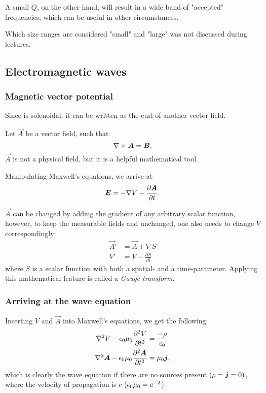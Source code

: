         A small $Q$, on the other hand, will result in a wide band of "accepted" frequencies, which can be useful in other circumstances.
    
        Which size ranges are considered "small" and "large" was not discussed during lectures. 

\subsection{Electromagnetic waves}
    \subsubsection{Magnetic vector potential}
        Since \B{} is solenoidal, it can be written as the curl of another vector field. 
        
        Let $\vec{A}$ be a vector field, such that
        \begin{equation}
            \nabla \times \bm{A} = \bm{B}.
        \end{equation}
        $\vec{A}$ is not a physical field, but it is a helpful mathematical tool. 

        Manipulating Maxwell's equations, we arrive at 
        \begin{equation}
            \bm{E} = -\nabla V - \frac{\partial \bm{A}}{\partial t}.
        \end{equation}
        
        $\vec{A}$ can be changed by adding the gradient of any arbitrary scalar function, 
        however, to keep the measurable fields \B{} and \E{} unchanged, one also needs to change $V$ correspondingly:
        \begin{align*}
            \vec{A}' &= \vec{A} + \nabla S \\
            V' &= V - \frac{\partial S}{\partial t}
        \end{align*}
        where $S$ is a scalar function with both a spatial- and a time-parameter.
        Applying this mathematical feature is called a \textit{Gauge transform}.
    \subsubsection{Arriving at the wave equation}
        Inserting $V$ and $\vec{A}$ into Maxwell's equations, we get the following: 
        \begin{align*}
            \nabla^2V - \epsilon_0\mu_0\frac{\partial^2V}{\partial t^2} &= \frac{-\rho}{\epsilon_0}\\
            \nabla^2\bm{A} - \epsilon_0\mu_0\frac{\partial^2\bm{A}}{\partial t^2} &= \mu_0\bm{j},
        \end{align*}
        which is clearly the wave equation if there are no sources present ($\rho = \bm{j} = 0)$, 
        where the velocity of propagation is $c$ ($\epsilon_0\mu_0 = c^{-2}$).

